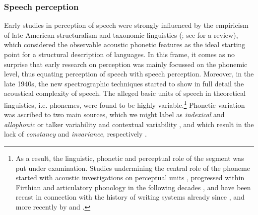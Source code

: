 \subsubsection{Speech perception}\label{sec1111}
Early studies in perception of speech were strongly influenced by the empiricism of late American structuralism and taxonomic linguistics (\citealt{harris1955phoneme, chomsky1965aspects}; see \citealt{matthews1993grammatical} for a review), which considered the observable acoustic phonetic features as the ideal starting point for a structural description of languages. In this frame, it comes as no surprise that early research on perception was mainly focussed on the phonemic level, thus equating perception of speech with speech perception. Moreover, in the late 1940s, the new spectrographic techniques started to show in full detail the acoustical complexity of speech. The alleged basic units of speech in theoretical linguistics, i.e. phonemes, were found to be highly variable.\footnote{As a result, the linguistic, phonetic and perceptual role of the segment was put under examination. Studies undermining the central role of the phoneme started with acoustic investigations on perceptual units \citep{cooper1952experiments}, progressed within Firthian and articulatory phonology in the following decades \citep{firth1948prosodies,browman1986articulatory}, and have been recast in connection with the history of writing systems already since \citet{faber1992phonemic}, and more recently by \citet{albanoleoni2006statuto} and \citet{port2006graphical}.} Phonetic variation was ascribed to two main sources, which we might label as \textit{indexical} and \textit{allophonic} \citep{luce2003abstractness} or talker variability and contextual variability \citep{johnson1997complex}, and which result in the lack of \textit{constancy} and \textit{invariance}, respectively \citep{jusczyk2002speech}. 

